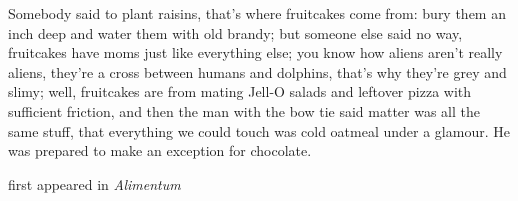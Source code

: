 Somebody said to plant raisins, that's where fruitcakes come from: bury
them an inch deep and water them with old brandy; but someone else said
no way, fruitcakes have moms just like everything else; you know how
aliens aren't really aliens, they're a cross between humans and
dolphins, that's why they're grey and slimy; well, fruitcakes are from
mating Jell-O salads and leftover pizza with sufficient friction, and
then the man with the bow tie said matter was all the same stuff, that
everything we could touch was cold oatmeal under a glamour. He was
prepared to make an exception for chocolate.

first appeared in \emph{Alimentum}
